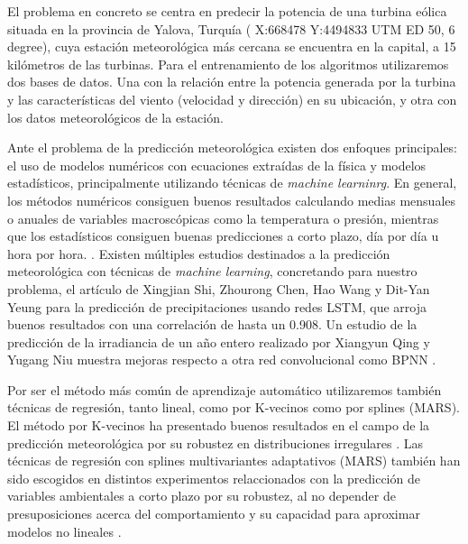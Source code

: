 \documentclass[journal]{IEEEtran}
\begin{document}
El problema en concreto se centra en  predecir la potencia de una turbina eólica situada en la provincia de Yalova, Turquía ( X:668478 Y:4494833 UTM ED 50, 6 degree), cuya estación meteorológica más cercana se encuentra en la capital, a 15 kilómetros de las turbinas.
Para el entrenamiento de los algoritmos utilizaremos dos bases de datos. Una con la relación entre la potencia generada por la turbina y las características del viento (velocidad y dirección) en su ubicación, y otra con los datos meteorológicos de la estación.


Ante el problema de la predicción meteorológica existen dos enfoques principales: el uso de modelos numéricos con ecuaciones extraídas de la física y modelos estadísticos, principalmente utilizando técnicas de \emph{machine learninrg}. \cite{FOLEY20121} En general, los métodos numéricos consiguen buenos resultados calculando medias mensuales o anuales de variables macroscópicas como la temperatura o presión, mientras que los estadísticos consiguen buenas predicciones a corto plazo, día por día u hora por hora. \cite{FOLEY20121} \cite{GIEBEL2003}.
Existen múltiples estudios destinados a la predicción meteorológica con técnicas de \emph{machine learning}, concretando para nuestro problema, el artículo de Xingjian Shi, Zhourong Chen, Hao Wang y Dit-Yan Yeung  para la predicción de precipitaciones usando redes LSTM\cite{NIPS2015_5955}, que arroja buenos resultados con una correlación de hasta un 0.908. Un estudio de la predicción de la irradiancia de un año entero realizado por Xiangyun Qing y Yugang Niu muestra mejoras respecto a otra red convolucional como BPNN \cite{QING2018461}.

Por ser el método más común de aprendizaje automático utilizaremos también técnicas de regresión, tanto lineal, como por K-vecinos como por splines (MARS). El método por K-vecinos ha presentado buenos resultados en el campo de la predicción meteorológica por su robustez en distribuciones irregulares \cite{HUANG201789}. Las técnicas de regresión con splines multivariantes adaptativos (MARS) también han sido escogidos en distintos experimentos relaccionados con la predicción de variables ambientales a corto plazo por su robustez, al no depender de presuposiciones acerca del comportamiento y su capacidad para aproximar modelos no lineales \cite{KRZEMIEN2019777} \cite{PA_LEWIS1991_864}.
\end{document}
